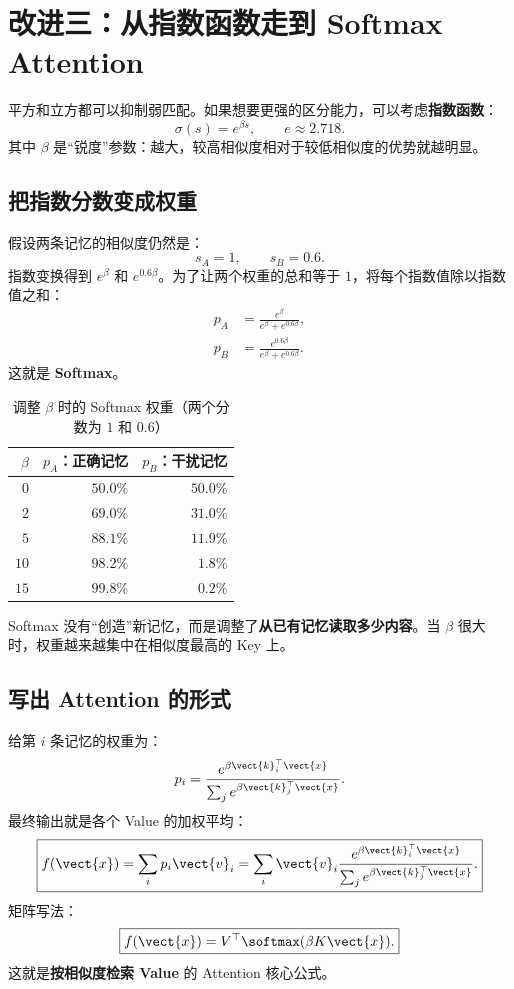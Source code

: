 \section{改进三：从指数函数走到 Softmax Attention}

平方和立方都可以抑制弱匹配。如果想要更强的区分能力，可以考虑\textbf{指数函数}：
\begin{equation}
\sigma(s)=e^{\beta s},\qquad e\approx2.718.
\end{equation}
其中 $\beta$ 是“锐度”参数：越大，较高相似度相对于较低相似度的优势就越明显。

\subsection{把指数分数变成权重}
假设两条记忆的相似度仍然是：
\[
s_A=1,\qquad s_B=0.6.
\]
指数变换得到 $e^{\beta}$ 和 $e^{0.6\beta}$。为了让两个权重的总和等于 $1$，将每个指数值除以指数值之和：
\begin{align}
p_A&=\frac{e^{\beta}}{e^{\beta}+e^{0.6\beta}},\\
p_B&=\frac{e^{0.6\beta}}{e^{\beta}+e^{0.6\beta}}.
\end{align}
这就是 \textbf{Softmax}。

\begin{table}[H]
\centering
\caption{调整 $\beta$ 时的 Softmax 权重（两个分数为 $1$ 和 $0.6$）}
\begin{tabular}{@{}rrr@{}}
\toprule
$\beta$ & $p_A$：正确记忆 & $p_B$：干扰记忆\\
\midrule
$0$ & $50.0\%$ & $50.0\%$\\
$2$ & $69.0\%$ & $31.0\%$\\
$5$ & $88.1\%$ & $11.9\%$\\
$10$ & $98.2\%$ & $1.8\%$\\
$15$ & $99.8\%$ & $0.2\%$\\
\bottomrule
\end{tabular}
\end{table}

\begin{idea}
Softmax 没有“创造”新记忆，而是调整了\textbf{从已有记忆读取多少内容}。当 $\beta$ 很大时，权重越来越集中在相似度最高的 Key 上。
\end{idea}

\subsection{写出 Attention 的形式}
给第 $i$ 条记忆的权重为：
\begin{equation}
p_i=\frac{e^{\beta\vect{k}_i^\top\vect{x}}}{\sum_j e^{\beta\vect{k}_j^\top\vect{x}}}.
\end{equation}
最终输出就是各个 Value 的加权平均：
\begin{equation}
\boxed{f(\vect{x})=\sum_i p_i\vect{v}_i
=\sum_i\vect{v}_i\frac{e^{\beta\vect{k}_i^\top\vect{x}}}{\sum_j e^{\beta\vect{k}_j^\top\vect{x}}}.}
\end{equation}
矩阵写法：
\begin{equation}
\boxed{f(\vect{x})=V^\top\softmax(\beta K\vect{x}).}
\end{equation}
这就是\textbf{按相似度检索 Value} 的 Attention 核心公式。

